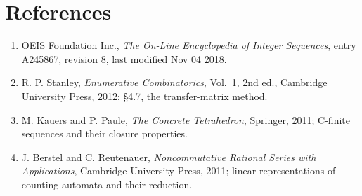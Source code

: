 \documentclass[11pt]{article}
\theoremstyle{definition}
\begin{document}
\section{References}

\begin{enumerate}

\item OEIS Foundation Inc., \emph{The On-Line Encyclopedia of Integer Sequences}, entry \href{https://oeis.org/A245867}{A245867}, revision 8, last modified Nov 04 2018.

\item R. P. Stanley, \emph{Enumerative Combinatorics}, Vol.~1, 2nd ed., Cambridge University Press, 2012; \S4.7, the transfer-matrix method.

\item M. Kauers and P. Paule, \emph{The Concrete Tetrahedron}, Springer, 2011; C-finite sequences and their closure properties.

\item J. Berstel and C. Reutenauer, \emph{Noncommutative Rational Series with Applications}, Cambridge University Press, 2011; linear representations of counting automata and their reduction.

\end{enumerate}
\end{document}
